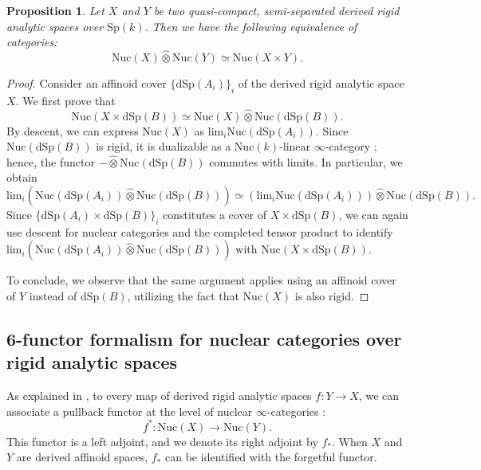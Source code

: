 \documentclass[oneside, hidelinks, 12pt, a4paper,reqno]{amsart}
\theoremstyle{plain}
\theoremstyle{definition}
\theoremstyle{plain}
\newtheorem{proposition}[proposition]{Proposition}
\newcommand{\dSp}{\mathrm{dSp}}
\newcommand{\Spk}{\mathrm{Sp}(k)}
\newcommand{\cat}{$\infty$-category }
\newcommand{\cates}{$\infty$-categories }
\newcommand{\Nuc}{\mathrm{Nuc}}
\newcommand{\Lim}{\mathrm{lim}}
\newcommand{\cotimes}{\widehat{\otimes}}
\begin{document}
\begin{proposition}\label{prop: kunneth for nuclear moduels}
    Let $X$ and $Y$ be two quasi-compact, semi-separated derived rigid analytic spaces over $\Spk$. Then we have the following equivalence of categories:
    \begin{equation*}
        \Nuc(X)\cotimes \Nuc(Y) \simeq \Nuc(X\times Y).
    \end{equation*}
\end{proposition}
\begin{proof}
    Consider an affinoid cover $\{\dSp(A_i)\}_{i}$ of the derived rigid analytic space $X$. We first prove that
    \begin{equation}\label{eq:Kunneth step 1}
        \Nuc(X \times \dSp(B)) \simeq \Nuc(X) \cotimes \Nuc(\dSp(B)).
    \end{equation}
    By descent, we can express $\Nuc(X)$ as $\Lim_{i}\Nuc(\dSp(A_{i}))$. Since $\Nuc(\dSp(B))$ is rigid, it is dualizable as a $\Nuc(k)$-linear \cat; hence, the functor $-\cotimes \Nuc(\dSp(B))$ commutes with limits. In particular, we obtain
    \begin{equation*}
        \Lim_{i}(\Nuc(\dSp(A_{i}))\cotimes \Nuc(\dSp(B))) \simeq \left(\Lim_{i}\Nuc(\dSp(A_{i}))\right)\cotimes \Nuc(\dSp(B)).
    \end{equation*}
    Since $\{\dSp(A_{i})\times \dSp(B) \}_{i}$ constitutes a cover of $X \times \dSp(B)$, we can again use descent for nuclear categories and the completed tensor product to identify $\Lim_{i}(\Nuc(\dSp(A_{i}))\cotimes \Nuc(\dSp(B)))$ with $\Nuc(X \times \dSp(B))$.
    
    To conclude, we observe that the same argument applies using an affinoid cover of $Y$ instead of $\dSp(B)$, utilizing the fact that $\Nuc(X)$ is also rigid.
\end{proof}

\subsection{6-functor formalism for nuclear categories over rigid analytic spaces}

As explained in , to every map of derived rigid analytic spaces $f\colon Y \to X$, we can associate a pullback functor at the level of nuclear \cates: 
\[
f^*\colon \Nuc(X)\to \Nuc(Y).
\]
This functor is a left adjoint, and we denote its right adjoint by $f_{\ast}$. When $X$ and $Y$ are derived affinoid spaces, $f_{\ast}$ can be identified with the forgetful functor.
\end{document}
